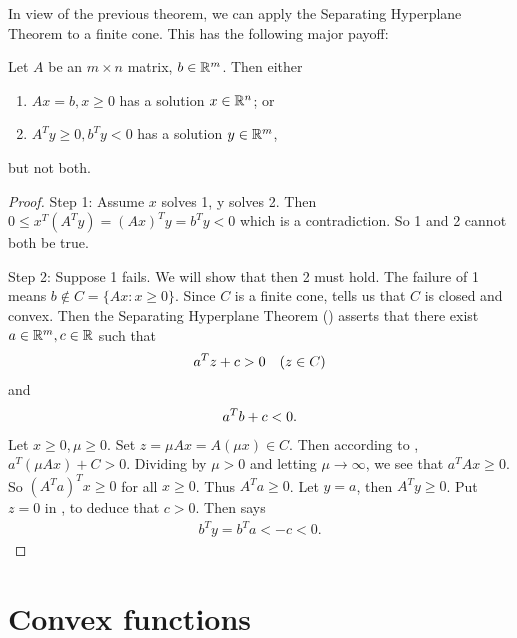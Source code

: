 In view of the previous theorem, we can apply the Separating Hyperplane
Theorem to a finite cone. 
This has the following major payoff:

\begin{theorem}
Let $A$ be an $m \times n$ matrix, $b \in \mathbb{R}^m$.
Then either 
\begin{enumerate}
    \item $A x = b, x \ge 0$ has a solution $x \in \mathbb{R}^n$; or
    \item $A^T y \ge 0, b^T y < 0$ has a solution $y \in \mathbb{R}^m$,
\end{enumerate}
but not both.
\end{theorem}

\begin{proof}
Step 1:
Assume $x$ solves 1, y solves 2.
Then $0 \le x^T (A^T y) = (Ax)^T y = b^T y < 0$ which is a contradiction.
So 1 and 2 cannot both be true.

Step 2:
Suppose 1 fails.
We will show that then 2 must hold.
The failure of 1 means $b \notin C = \{ Ax : x \ge 0\}$.
Since $C$ is a finite cone,  tells us  that $C$ is closed and convex.
Then the Separating Hyperplane Theorem () asserts that there exist $a \in \mathbb{R}^m, c \in \mathbb{R}$ such that 
\begin{align}
a^T z + c > 0 \quad (z \in C) \labeq{proof_farkas_alternative_eq_1}
\end{align}
and 
\begin{align}
a^T b + c < 0. \labeq{proof_farkas_alternative_eq_2}
\end{align}
Let $x \ge 0, \mu \ge 0$.
Set $z = \mu A x = A (\mu x) \in C$.
Then according to , $a^T (\mu A x) + C > 0$.
Dividing by $\mu > 0$ and letting $\mu \to \infty$, we see that $a^T Ax \ge 0$.
So $(A^T a)^T x \ge 0$ for all $x \ge 0$.
Thus $A^T a \ge 0$.
Let $y = a$, then $A^T y \ge 0$.
Put $z = 0$ in , to deduce that $c > 0$.
Then  says
\begin{align}
b^T y = b^T a < -c < 0.
\end{align}
\end{proof}

\section{Convex functions}

